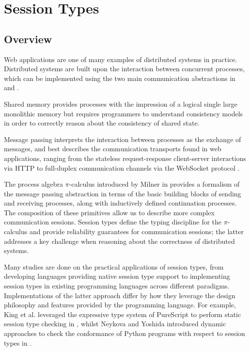 \section{Session Types}

\subsection{Overview}
Web applications are one of many examples of distributed systems in practice. Distributed systems are built upon the interaction between concurrent processes, which can be implemented using the two main communication abstractions in  and . 

Shared memory provides processes with the impression of a logical single large monolithic memory but requires programmers to understand consistency models in order to correctly reason about the consistency of shared state.

Message passing interprets the interaction between processes as the exchange of messages, and best describes the communication transports found in web applications, ranging from the stateless request-response client-server interactions via HTTP to full-duplex communication channels via the WebSocket protocol \cite{WebSocketRFC}.

The process algebra $\pi$-calculus introduced by Milner in \cite{Milner1999} provides a formalism of the message passing abstraction in terms of the basic building blocks of sending and receiving processes, along with inductively defined continuation processes. The composition of these primitives allow us to describe more complex communication sessions.
Session types define the typing discipline for the $\pi$-calculus and provide reliability guarantees for communication sessions; the latter addresses a key challenge when reasoning about the correctness of distributed systems. 

Many studies are done on the practical applications of session types, from developing languages providing native session type support \cite{ATS2016} to implementing session types in existing programming languages across different paradigms.
Implementations of the latter approach differ by how they leverage the design philosophy and features provided by the programming language. For example, King et al. leveraged the expressive type system of PureScript to perform static session type checking in \cite{PureScript2019}, whilst Neykova and Yoshida introduced dynamic approaches to check the conformance of Python programs with respect to session types in \cite{Python2017}.

